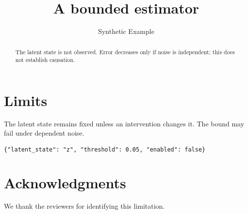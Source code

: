 \documentclass[twocolumn]{article}
\title{A bounded estimator}
\author{Synthetic Example}
\date{}
\newcommand{\ack}{We thank the reviewers for identifying this limitation.}
\begin{document}
\maketitle
\begin{abstract}
The latent state is not observed. Error decreases only if noise is independent; this does not establish causation.
\end{abstract}

\appendix
\section{Limits}\label{app:limits}
The latent state remains fixed unless an intervention changes it. The bound may fail under dependent noise.
\begin{verbatim}
{"latent_state": "z", "threshold": 0.05, "enabled": false}
\end{verbatim}
\section*{Acknowledgments}
\ack


\end{document}
